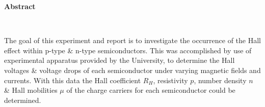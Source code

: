 \vspace{80ex}

\begin{center}
\begin{Large}
\textbf{Abstract}
\end{Large} \\
\vspace{3ex}
\begin{small}
The goal of this experiment and report is to investigate the occurrence of the Hall effect within p-type \& n-type semiconductors. This was accomplished by use of experimental apparatus  provided by the University, to determine the Hall voltages \& voltage drops of each semiconductor under varying magnetic fields and currents. With this data the Hall coefficient $R_{H}$, resistivity $p$, number density $n$ \& Hall mobilities $\mu$ of the charge carriers for each semiconductor could be determined.  
\end{small}
\end{center}
\newpage